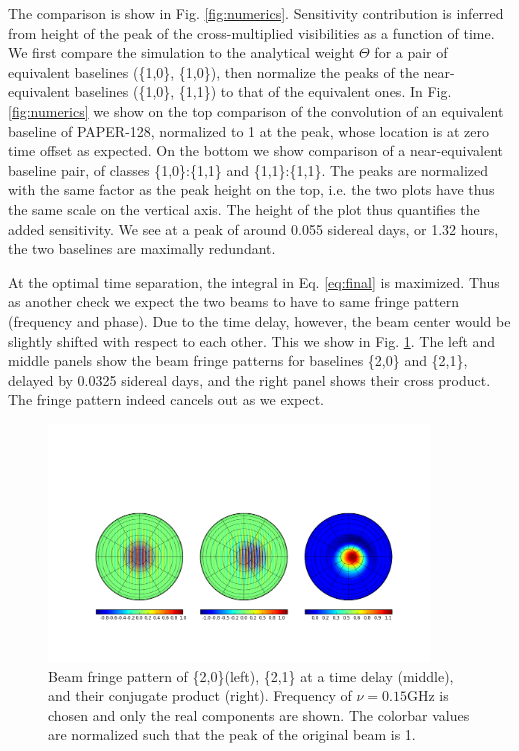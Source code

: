 \documentclass[twocolumn,apj,numberedappendix]{emulateapj}
\renewcommand\[{\begin{equation}}
\renewcommand\]{\end{equation}}
\begin{document}
The comparison is show in Fig. \ref{fig:numerics}. 
Sensitivity contribution is inferred from height of the peak of the cross-multiplied visibilities as a function of time. 
We first compare the simulation to the analytical weight $\Theta$ for a pair of equivalent baselines (\{1,0\}, \{1,0\}), then normalize the peaks 
of the near-equivalent baselines (\{1,0\}, \{1,1\}) to that of the equivalent ones. 
In Fig. \ref{fig:numerics}  we show on the top comparison of
the convolution of an equivalent baseline of PAPER-128, normalized to 1 at the
peak, whose location is at zero time offset as expected. On the bottom we show
comparison of a near-equivalent baseline pair, of classes \{1,0\}:\{1,1\} and \{1,1\}:\{1,1\}. The peaks
are normalized with the same factor as the peak height on the top,
i.e. the two plots have thus the same scale on the vertical axis.
The height of the plot thus quantifies the added sensitivity. We see at a peak of around 0.055 sidereal days, or 1.32 hours, the two baselines are maximally redundant. 




At the optimal time separation, the integral in Eq. \eqref{eq:final}
is maximized. Thus as another check we expect the two beams to have to same fringe pattern
(frequency and phase). Due to the time delay, however, the beam center
would be slightly shifted with respect to each other. This we show
in Fig. \ref{fig:Beam-fringe-pattern}. The left and middle panels show the beam fringe
patterns for baselines \{2,0\} and \{2,1\}, delayed by 0.0325 sidereal days,
and the right panel shows their cross product. The fringe pattern
indeed cancels out as we expect. 


\begin{figure}[h!]
\includegraphics[width=0.9\textwidth]{fringe_res}
\caption{Beam fringe pattern of \{2,0\}(left), \{2,1\} at a time delay (middle),
and their conjugate product (right). Frequency of $\nu=0.15\text{GHz}$ is
chosen and only the real components are shown. The colorbar values are normalized such that the peak of the original beam is 1. \label{fig:Beam-fringe-pattern}}
\end{figure}
\end{document}
